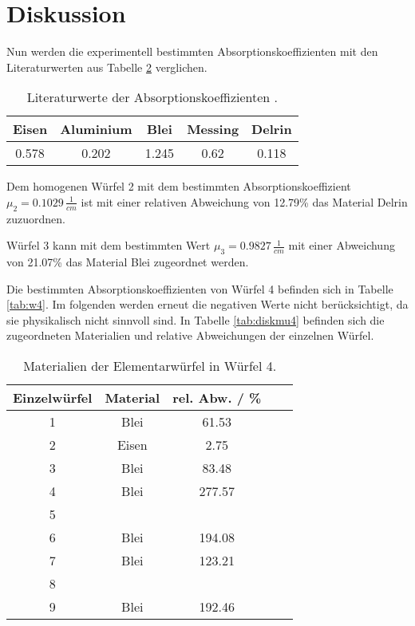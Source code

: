 \section{Diskussion}
\label{sec:Diskussion}

\noindent
Nun werden die experimentell bestimmten Absorptionskoeffizienten mit den Literaturwerten aus Tabelle \ref{tab:lit} verglichen.


\begin{table}
    \centering
    \begin{tabular}{c c c c c}
    \toprule
    Eisen & Aluminium & Blei & Messing & Delrin\\
     \midrule 
    0.578 & 0.202 & 1.245 & 0.62 & 0.118\\
\bottomrule
\end{tabular}
\caption{Literaturwerte der Absorptionskoeffizienten \cite{chemie} \cite{delrin}.}
\label{tab:lit}
\end{table}
    
\noindent
Dem homogenen Würfel 2 mit dem bestimmten Absorptionskoeffizient $\mu_2 = 0.1029 \, \frac{1}{cm}$ ist mit einer relativen Abweichung von 12.79\% das Material Delrin zuzuordnen.

\noindent
Würfel 3 kann mit dem bestimmten Wert $\mu_3 = 0.9827 \, \frac{1}{cm}$ mit einer Abweichung von 21.07\% das Material Blei zugeordnet werden.

\noindent
Die bestimmten Absorptionskoeffizienten von Würfel 4 befinden sich in Tabelle \ref{tab:w4}.
Im folgenden werden erneut die negativen Werte nicht berücksichtigt, da sie physikalisch nicht sinnvoll sind.
In Tabelle \ref{tab:diskmu4} befinden sich die zugeordneten Materialien und relative Abweichungen der einzelnen Würfel.

\begin{table}
    \centering
    \begin{tabular}{c c c c c}
    \toprule
    Einzelwürfel & Material & rel. Abw. / \% \\
     \midrule 
    1 & Blei & 61.53\\
    2 & Eisen & 2.75 \\
    3 & Blei & 83.48\\
    4 & Blei & 277.57\\
    5 &  &\\
    6 & Blei &194.08\\
    7 & Blei &123.21\\
    8 &  &\\
    9 & Blei &192.46\\
\bottomrule
\end{tabular}
\caption{Materialien der Elementarwürfel in Würfel 4.}
\label{tab:lit}
\end{table}

